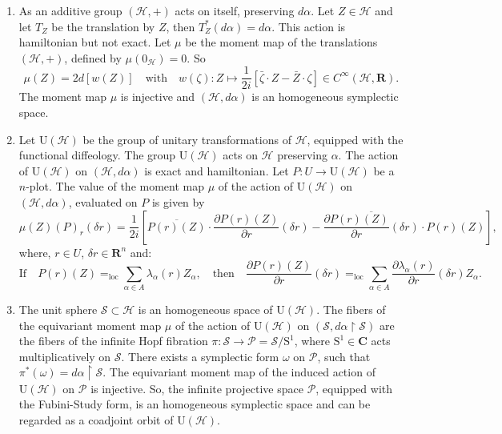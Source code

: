 \documentclass[10pt,reqno,twoside]{amsart}
\theoremstyle{plain}
\theoremstyle{definition}
\begin{document}
  \begin{enumerate}
    \item As an additive group $(\mathcal{H},+)$ acts on itself,
    preserving $d\alpha$.
    Let $Z \in \mathcal{H}$ and let $T_Z$ be the translation by $Z$,
    then $T^*_Z(d\alpha) = d\alpha$.
    This action is hamiltonian but not exact.
    Let $\mu$ be the moment map of the translations $(\mathcal{H},+)$,
    defined by $\mu(0_\mathcal{H}) = 0$.
    So
    \[
    \mu(Z) = 2d[w(Z)] \quad\text{with}\quad w(\zeta) : Z \mapsto \frac{1}{2i} [ \bar{\zeta} \cdot Z - \bar{Z} \cdot \zeta ] \in C^\infty(\mathcal{H},\mathbf{R}).
    \]
    The moment map $\mu$ is injective and $(\mathcal{H},d\alpha)$ is an homogeneous symplectic space.
    
    \item Let $\mathrm{U}(\mathcal{H})$ be the group of unitary transformations of $\mathcal{H}$,
    equipped with the functional diffeology.
    The group $\mathrm{U}(\mathcal{H})$ acts on $\mathcal{H}$ preserving $\alpha$.
    The action of $\mathrm{U}(\mathcal{H})$ on $(\mathcal{H},d\alpha)$ is exact and hamiltonian.
    Let $P : U \to \mathrm{U}(\mathcal{H})$ be a $n$-plot.
    The value of the moment map $\mu$ of the action of $\mathrm{U}(\mathcal{H})$ on $(\mathcal{H},d\alpha)$,
    evaluated on $P$ is given by
    \[
    \mu(Z)(P)_r(\delta r) = \frac{1}{2i} \left[ \overline{P(r)(Z)} \cdot \frac{\partial P(r)(Z)}{\partial r}(\delta r) - \overline{\frac{\partial P(r)(Z)}{\partial r}(\delta r)} \cdot P(r)(Z) \right],
    \]
    where,
    $r \in U$,
    $\delta r \in \mathbf{R}^n$ and:
    \[
    \text{If} \quad P(r)(Z) =_{\mathrm{loc}} \sum_{\alpha \in A} \lambda_\alpha(r) Z_\alpha,
    \quad\text{then}\quad
    \frac{\partial P(r)(Z)}{\partial r}(\delta r) =_{\mathrm{loc}} \sum_{\alpha \in A} \frac{\partial \lambda_\alpha(r)}{\partial r}(\delta r) Z_\alpha.
    \]
    
    \item The unit sphere $\mathcal{S} \subset \mathcal{H}$ is an homogeneous space of $\mathrm{U}(\mathcal{H})$.
    The fibers of the equivariant moment map $\mu$ of the action of $\mathrm{U}(\mathcal{H})$ on $(\mathcal{S},d\alpha \restriction \mathcal{S})$ are the fibers of the infinite Hopf fibration $\pi : \mathcal{S} \to \mathcal{P} = \mathcal{S}/\mathrm{S}^1$,
    where $\mathrm{S}^1 \in \mathbf{C}$ acts multiplicatively on $\mathcal{S}$.
    There exists a symplectic form $\omega$ on $\mathcal{P}$,
    such that $\pi^*(\omega) = d\alpha \restriction \mathcal{S}$.
    The equivariant moment map of the induced action of $\mathrm{U}(\mathcal{H})$ on $\mathcal{P}$ is injective.
    So,
    the infinite projective space $\mathcal{P}$,
    equipped with the Fubini-Study form,
    is an homogeneous symplectic space and can be regarded as a coadjoint orbit of $\mathrm{U}(\mathcal{H})$.
  \end{enumerate}
  
\end{document}
